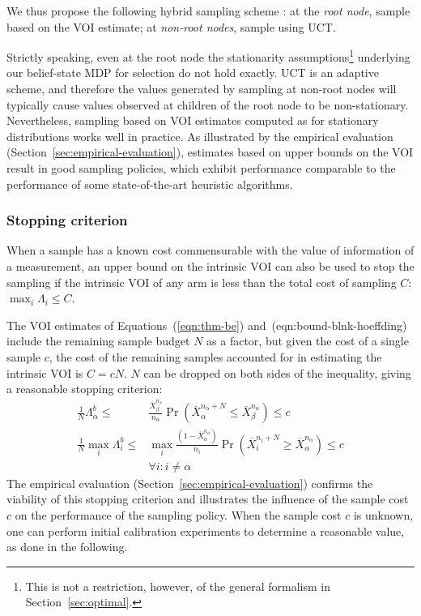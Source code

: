 We thus propose the following hybrid sampling scheme \cite{TolpinShimony.mcts}: 
	at the \emph{root node}, sample based on the VOI estimate;
	at \emph{non-root nodes}, sample using UCT.

Strictly speaking, even at the root node the stationarity assumptions\footnote{This is not a restriction,
however, of the general formalism in Section~\ref{sec:optimal}.} 
underlying our belief-state
MDP for selection do not hold exactly. UCT is an adaptive scheme, and therefore the values
generated by sampling at non-root nodes will typically cause values observed at
children of the root node to be non-stationary. 
Nevertheless, sampling based on VOI estimates
computed as for stationary distributions works well in
practice. As illustrated
by the empirical evaluation (Section~\ref{sec:empirical-evaluation}),
estimates based on upper bounds on the VOI result in good sampling
policies, which exhibit performance comparable to the performance of
some state-of-the-art heuristic algorithms.


\subsubsection{Stopping criterion}
\label{sec:control-stopping-criterion}

When a sample has a known cost commensurable with the value of
information of a measurement, an upper bound on the intrinsic VOI can also
be used to stop the sampling if the intrinsic VOI of any arm
is less than the total cost of sampling $C$: $\max_i \Lambda_i \le C$.

The VOI estimates of Equations~(\ref{eqn:thm-be}) and~({eqn:bound-blnk-hoeffding})
include the remaining sample budget $N$ as a
factor, but given the cost of a single sample $c$, the cost of the
remaining samples accounted for in estimating the intrinsic VOI is
$C=cN$. $N$ can be dropped on both sides of the inequality,
giving a reasonable stopping criterion:
\begin{align}
\frac 1 N \Lambda_\alpha^b \le&\frac {\overline X_\beta^{n_\beta}}
  {n_\alpha}\Pr(\overline X_\alpha^{n_\alpha+N}\le\overline
  X_\beta^{n_\alpha})\le c\nonumber\\
\frac 1 N \max_i\Lambda_i^b\le &\max_i\frac {(1-\overline X_\alpha^{n_\alpha})} {n_i}\Pr(\overline
  X_i^{n_i+N}\ge\overline X_\alpha^{n_\alpha})\le c\nonumber\\
    &\forall i: i\ne\alpha
\label{eqn:stopping-blnk}
\end{align}
The empirical evaluation (Section~\ref{sec:empirical-evaluation})
confirms the viability of this stopping criterion and illustrates the
influence of the sample cost $c$ on the performance of
the sampling policy. When the sample cost $c$ is unknown, one can perform initial calibration experiments
to determine a reasonable value, as done in the following.

